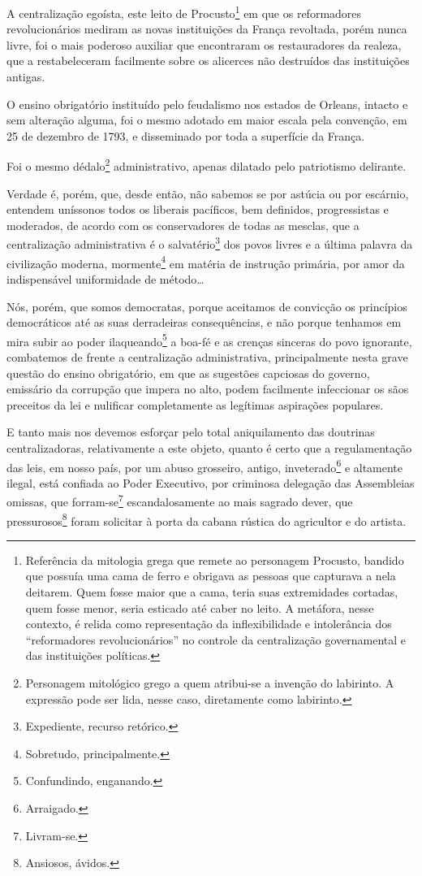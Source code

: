 A centralização egoísta, este leito de Procusto\footnote{Referência da
  mitologia grega que remete ao personagem Procusto, bandido que possuía
  uma cama de ferro e obrigava as pessoas que capturava a nela deitarem.
  Quem fosse maior que a cama, teria suas extremidades cortadas, quem
  fosse menor, seria esticado até caber no leito. A metáfora, nesse
  contexto, é relida como representação da inflexibilidade e
  intolerância dos ``reformadores revolucionários'' no controle da
  centralização governamental e das instituições políticas.} em que os
reformadores revolucionários mediram as novas instituições da França
revoltada, porém nunca livre, foi o mais poderoso auxiliar que
encontraram os restauradores da realeza, que a restabeleceram facilmente
sobre os alicerces não destruídos das instituições antigas.

O ensino obrigatório instituído pelo feudalismo nos estados de Orleans,
intacto e sem alteração alguma, foi o mesmo adotado em maior escala pela
convenção, em 25 de dezembro de 1793, e disseminado por toda a
superfície da França.

Foi o mesmo dédalo\footnote{Personagem mitológico grego a quem
  atribui-se a invenção do labirinto. A expressão pode ser lida, nesse
  caso, diretamente como labirinto.} administrativo, apenas dilatado
pelo patriotismo delirante.

Verdade é, porém, que, desde então, não sabemos se por astúcia ou por
escárnio, entendem uníssonos todos os liberais pacíficos, bem definidos,
progressistas e moderados, de acordo com os conservadores de todas as
mesclas, que a centralização administrativa é o salvatério\footnote{
  Expediente, recurso retórico.} dos povos livres e a última palavra da
civilização moderna, mormente\footnote{Sobretudo, principalmente.} em
matéria de instrução primária, por amor da indispensável uniformidade de
método\ldots{}

Nós, porém, que somos democratas, porque aceitamos de convicção os
princípios democráticos até as suas derradeiras consequências, e não
porque tenhamos em mira subir ao poder ilaqueando\footnote{
  Confundindo, enganando.} a boa-fé e as crenças sinceras do povo
ignorante, combatemos de frente a centralização administrativa,
principalmente nesta grave questão do ensino obrigatório, em que as
sugestões capciosas do governo, emissário da corrupção que impera no
alto, podem facilmente infeccionar os sãos preceitos da lei e nulificar
completamente as legítimas aspirações populares.

E tanto mais nos devemos esforçar pelo total aniquilamento das doutrinas
centralizadoras, relativamente a este objeto, quanto é certo que a
regulamentação das leis, em nosso país, por um abuso grosseiro, antigo,
inveterado\footnote{Arraigado.} e altamente ilegal, está confiada ao
Poder Executivo, por criminosa delegação das Assembleias omissas, que
forram-se\footnote{Livram-se.} escandalosamente ao mais sagrado dever,
que pressurosos\footnote{Ansiosos, ávidos.} foram solicitar à porta da
cabana rústica do agricultor e do artista.

